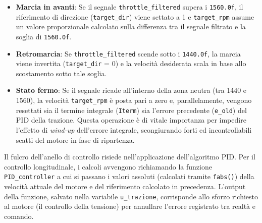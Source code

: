 \documentclass[11pt]{report}
\begin{document}
\begin{itemize}
    \item \textbf{Marcia in avanti}: Se il segnale \texttt{throttle\_filtered} supera i \texttt{1560.0f}, il riferimento di direzione (\texttt{target\_dir}) viene settato a 1 e \texttt{target\_rpm} assume un valore proporzionale calcolato sulla differenza tra il segnale filtrato e la soglia di \texttt{1560.0f}. 
    
    \item \textbf{Retromarcia}: Se \texttt{throttle\_filtered} scende sotto i \texttt{1440.0f}, la marcia viene invertita (\texttt{target\_dir} = 0) e la velocità desiderata scala in base allo scostamento sotto tale soglia.
    
    \item \textbf{Stato fermo}: Se il segnale ricade all'interno della zona neutra (tra 1440 e 1560), la velocità \texttt{target\_rpm} è posta pari a zero e, parallelamente, vengono resettati sia il termine integrale (\texttt{Iterm}) sia l'errore precedente (\texttt{e\_old}) del PID della trazione. Questa operazione è di vitale importanza per impedire l'effetto di \textit{wind-up} dell'errore integrale, scongiurando forti ed incontrollabili scatti del motore in fase di ripartenza.
\end{itemize}

\noindent Il fulcro dell'anello di controllo risiede nell'applicazione dell'algoritmo PID. Per il controllo longitudinale, i calcoli avvengono richiamando la funzione \texttt{PID\_controller} a cui si passano i valori assoluti (calcolati tramite \texttt{fabs()}) della velocità attuale del motore e del riferimento calcolato in precedenza. L'output della funzione, salvato nella variabile \texttt{u\_trazione}, corrisponde allo sforzo richiesto al motore (il controllo della tensione) per annullare l'errore registrato tra realtà e comando.
\end{document}
